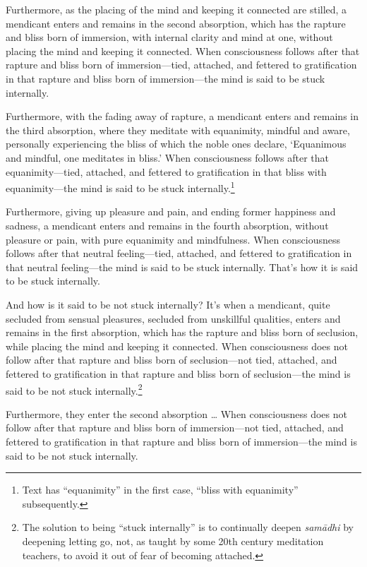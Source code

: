 \documentclass[12pt,openany]{book}%
\begin{document}
Furthermore, as the placing of the mind and keeping it connected are stilled, a mendicant enters and remains in the second absorption, which has the rapture and bliss born of immersion, with internal clarity and mind at one, without placing the mind and keeping it connected. When consciousness follows after that rapture and bliss born of immersion—tied, attached, and fettered to gratification in that rapture and bliss born of immersion—the mind is said to be stuck internally. 

Furthermore, with the fading away of rapture, a mendicant enters and remains in the third absorption, where they meditate with equanimity, mindful and aware, personally experiencing the bliss of which the noble ones declare, ‘Equanimous and mindful, one meditates in bliss.’ When consciousness follows after that equanimity—tied, attached, and fettered to gratification in that bliss with equanimity—the mind is said to be stuck internally.\footnote{Text has “equanimity” in the first case, “bliss with equanimity” subsequently. } 

Furthermore, giving up pleasure and pain, and ending former happiness and sadness, a mendicant enters and remains in the fourth absorption, without pleasure or pain, with pure equanimity and mindfulness. When consciousness follows after that neutral feeling—tied, attached, and fettered to gratification in that neutral feeling—the mind is said to be stuck internally. That’s how it is said to be stuck internally. 

And how is it said to be not stuck internally? It’s when a mendicant, quite secluded from sensual pleasures, secluded from unskillful qualities, enters and remains in the first absorption, which has the rapture and bliss born of seclusion, while placing the mind and keeping it connected. When consciousness does not follow after that rapture and bliss born of seclusion—not tied, attached, and fettered to gratification in that rapture and bliss born of seclusion—the mind is said to be not stuck internally.\footnote{The solution to being “stuck internally” is to continually deepen \textit{\textsanskrit{samādhi}} by deepening letting go, not, as taught by some 20th century meditation teachers, to avoid it out of fear of becoming attached. } 

Furthermore, they enter the second absorption … When consciousness does not follow after that rapture and bliss born of immersion—not tied, attached, and fettered to gratification in that rapture and bliss born of immersion—the mind is said to be not stuck internally. 
\end{document}
